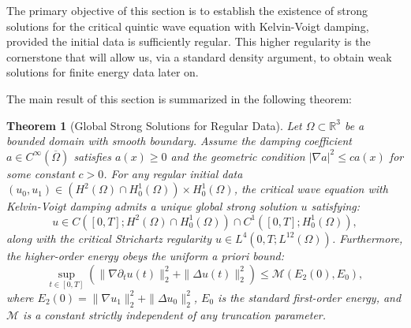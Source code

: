 \documentclass[11pt,letterpaper]{amsart}
\newtheorem{theorem}{Theorem}[section]
\begin{document}
The primary objective of this section is to establish the existence of strong solutions for the critical quintic wave equation with Kelvin-Voigt damping, provided the initial data is sufficiently regular. This higher regularity is the cornerstone that will allow us, via a standard density argument, to obtain weak solutions for finite energy data later on.

The main result of this section is summarized in the following theorem:

\begin{theorem}[Global Strong Solutions for Regular Data] \label{thm:strong_solutions}
Let $\Omega \subset \mathbb{R}^3$ be a bounded domain with smooth boundary. Assume the damping coefficient $a \in C^{\infty}(\overline{\Omega})$ satisfies $a(x) \ge 0$ and the geometric condition $|\nabla a|^2 \le c a(x)$ for some constant $c > 0$. For any regular initial data $(u_0, u_1) \in (H^2(\Omega) \cap H_0^1(\Omega)) \times H_0^1(\Omega)$, the critical wave equation with Kelvin-Voigt damping admits a unique global strong solution $u$ satisfying:
\begin{equation}
    u \in C([0,T]; H^2(\Omega) \cap H_0^1(\Omega)) \cap C^1([0,T]; H_0^1(\Omega)),
\end{equation}
along with the critical Strichartz regularity $u \in L^4(0,T; L^{12}(\Omega))$. Furthermore, the higher-order energy obeys the uniform a priori bound:
\begin{equation} \label{eq:thm_uniform_bound}
    \sup_{t \in [0,T]} \left( \|\nabla \partial_t u(t)\|_2^2 + \|\Delta u(t)\|_2^2 \right) \le \mathcal{M}(E_2(0), E_0),
\end{equation}
where $E_2(0) = \|\nabla u_1\|_2^2 + \|\Delta u_0\|_2^2$, $E_0$ is the standard first-order energy, and $\mathcal{M}$ is a constant strictly independent of any truncation parameter.
\end{theorem}
\end{document}
